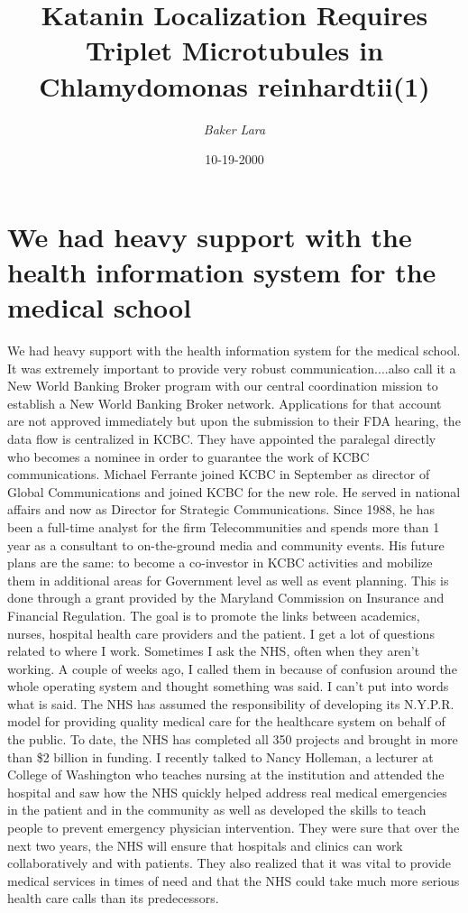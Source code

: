 \documentclass{article}%
\title{Katanin Localization Requires Triplet Microtubules in Chlamydomonas reinhardtii(1)}%
\author{\textit{Baker Lara}}%
\date{10-19-2000}%
\begin{document}
%
\normalsize%
\maketitle%
\section{We had heavy support with the health information system for the medical school}%
\label{sec:Wehadheavysupportwiththehealthinformationsystemforthemedicalschool}%
We had heavy support with the health information system for the medical school. It was extremely important to provide very robust communication....also call it a New World Banking Broker program with our central coordination mission to establish a New World Banking Broker network. Applications for that account are not approved immediately but upon the submission to their FDA hearing, the data flow is centralized in KCBC. They have appointed the paralegal directly who becomes a nominee in order to guarantee the work of KCBC communications.\newline%
Michael Ferrante joined KCBC in September as director of Global Communications and joined KCBC for the new role. He served in national affairs and now as Director for Strategic Communications. Since 1988, he has been a full{-}time analyst for the firm Telecommunities and spends more than 1 year as a consultant to on{-}the{-}ground media and community events. His future plans are the same: to become a co{-}investor in KCBC activities and mobilize them in additional areas for Government level as well as event planning. This is done through a grant provided by the Maryland Commission on Insurance and Financial Regulation. The goal is to promote the links between academics, nurses, hospital health care providers and the patient.\newline%
I get a lot of questions related to where I work. Sometimes I ask the NHS, often when they aren't working. A couple of weeks ago, I called them in because of confusion around the whole operating system and thought something was said. I can't put into words what is said.\newline%
The NHS has assumed the responsibility of developing its N.Y.P.R. model for providing quality medical care for the healthcare system on behalf of the public. To date, the NHS has completed all 350 projects and brought in more than \$2 billion in funding. I recently talked to Nancy Holleman, a lecturer at College of Washington who teaches nursing at the institution and attended the hospital and saw how the NHS quickly helped address real medical emergencies in the patient and in the community as well as developed the skills to teach people to prevent emergency physician intervention. They were sure that over the next two years, the NHS will ensure that hospitals and clinics can work collaboratively and with patients. They also realized that it was vital to provide medical services in times of need and that the NHS could take much more serious health care calls than its predecessors.\newline%
\end{document}
